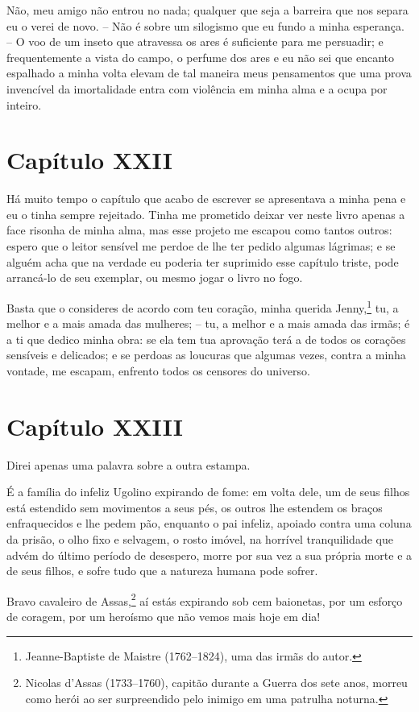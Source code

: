  Não, meu amigo não entrou no nada; qualquer que seja a barreira que nos
separa eu o verei de novo. -- Não é sobre um silogismo que eu fundo a
minha esperança. -- O voo de um inseto que atravessa os ares é
suficiente para me persuadir; e frequentemente a vista do campo, o
perfume dos ares e eu não sei que encanto espalhado a minha volta
elevam de tal maneira meus pensamentos que uma prova invencível da
imortalidade entra com violência em minha alma e a ocupa por inteiro.

\section{Capítulo XXII}

Há muito tempo o capítulo que acabo de escrever se apresentava a minha
pena e eu o tinha sempre rejeitado. Tinha me prometido deixar ver neste
livro apenas a face risonha de minha alma, mas esse projeto me escapou
como tantos outros: espero que o leitor sensível me perdoe de lhe ter
pedido algumas lágrimas; e se alguém acha que na verdade eu poderia ter
suprimido esse capítulo triste, pode arrancá-lo de seu exemplar, ou
mesmo jogar o livro no fogo. 

Basta que o consideres de acordo com teu coração, minha querida
Jenny,\footnote{ Jeanne-Baptiste de Maistre (1762--1824), uma das irmãs
do autor.} tu, a melhor e a mais amada das mulheres; -- tu, a
melhor e a mais amada das irmãs; é a ti que dedico minha obra: se ela
tem tua aprovação terá a de todos os corações sensíveis e delicados; e
se perdoas as loucuras que algumas vezes, contra a minha vontade, me
escapam, enfrento todos os censores do universo. 

\section{Capítulo XXIII}

 Direi apenas uma palavra sobre a outra estampa.

 É a família do infeliz Ugolino expirando de fome: em volta dele, um de
seus filhos está estendido sem movimentos a seus pés, os outros lhe
estendem os braços enfraquecidos e lhe pedem pão, enquanto o pai
infeliz, apoiado contra uma coluna da prisão, o olho fixo e selvagem, o
rosto imóvel, na horrível tranquilidade que advém do último período de
desespero, morre por sua vez a sua própria morte e a de seus filhos, e
sofre tudo que a natureza humana pode sofrer.

 Bravo cavaleiro de Assas,\footnote{ Nicolas d’Assas (1733--1760), capitão
durante a Guerra dos sete anos, morreu como herói ao ser surpreendido pelo
inimigo em uma patrulha noturna.} aí estás expirando sob cem
baionetas, por um esforço de coragem, por um heroísmo que não vemos
mais hoje em dia!

